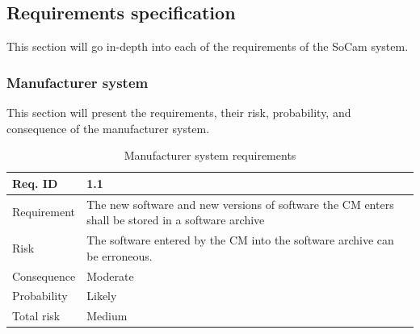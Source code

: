 \subsection{Requirements specification}
\label{section:requirements_specification}

This section will go in-depth into each of the requirements of the SoCam system. 

\subsubsection{Manufacturer system}

This section will present the requirements, their risk, probability, and consequence of the manufacturer system. 

\begin{table}[H]
\centering
\caption{Manufacturer system requirements}
\label{table:manufacturer}
\begin{tabularx}{1.0\textwidth}{
    |p{}%
    |p{}|%
}
\hline

Req. ID
& 1.1
\\
\hline

Requirement
& The new software and new versions of software the CM enters shall be stored in a software archive
\\
\hline

Risk
& 
The software entered by the CM into the software archive can be erroneous.
\\
\hline

Consequence
&
Moderate
\\
\hline

Probability
&
Likely
\\
\hline

Total risk
&
Medium
\\
\hline

\end{tabularx}
\end{table}


